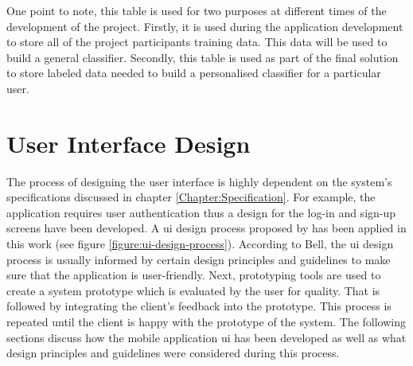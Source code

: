         One point to note, this table is used for two purposes at different times of the development of the project. Firstly, it is used during the application development to store all of the project participants training data. This data will be used to build a general classifier. Secondly, this table is used as part of the final solution to store labeled data needed to build a personalised classifier for a particular user.
    
    
        
    \section{User Interface Design}
    \label{section:user_interface_design}
    The process of designing the user interface is highly dependent on the system's specifications discussed in chapter \ref{Chapter:Specification}. For example, the application requires user authentication thus a design for the log-in and sign-up screens have been developed. A \gls{ui} design process proposed by \citet[60]{bell2005} has been applied in this work (see figure \ref{figure:ui-design-process}). According to Bell, the \gls{ui} design process is usually informed by certain design principles and guidelines to make sure that the application is user-friendly. Next, prototyping tools are used to create a system prototype which is evaluated by the user for quality. That is followed by integrating the client's feedback into the prototype. This process is repeated until the client is happy with the prototype of the system. The following sections discuss how the mobile application \gls{ui} has been developed as well as what design principles and guidelines were considered during this process.
    
